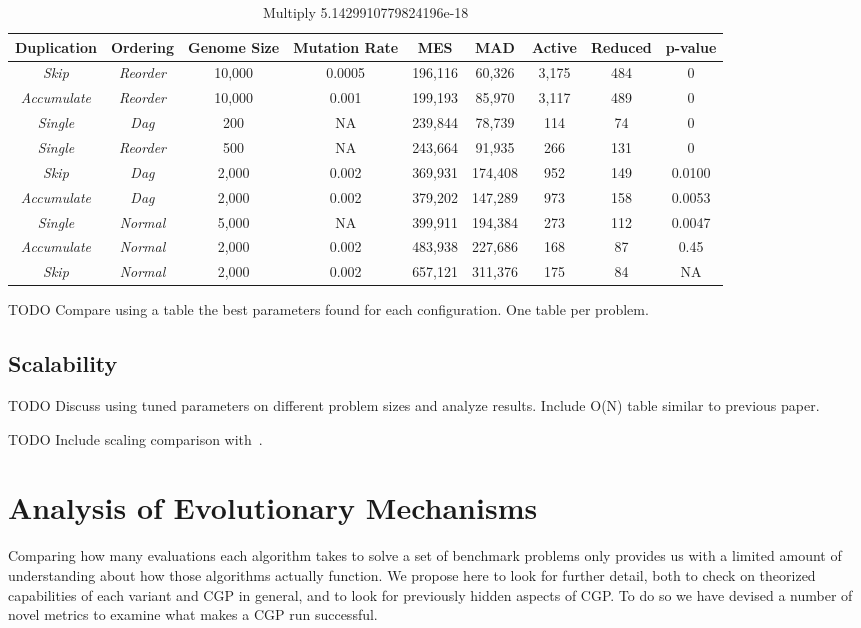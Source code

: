 \documentclass[journal]{IEEEtran}
\begin{document}
\begin{table*}
	\centering
	\begin{tabular}{|c|c|c|c|c|c|c|c|c|}
	  \hline
\textbf{Duplication} & \textbf{Ordering} & \textbf{Genome Size} & \textbf{Mutation Rate} & \textbf{MES} & \textbf{MAD} & \textbf{Active} & \textbf{Reduced} & \textbf{p-value} \\ \hline
\emph{Skip} & \emph{Reorder}      & 10,000 & 0.0005  & 196,116  & 60,326  & 3,175 & 484 & 0  \\ \hline
\emph{Accumulate} & \emph{Reorder}& 10,000 & 0.001 & 199,193 & 85,970 & 3,117 & 489 & 0  \\ \hline
\emph{Single} & \emph{Dag} & 200  & NA & 239,844 & 78,739 & 114 & 74 & 0 \\ \hline
\emph{Single} & \emph{Reorder}    & 500   & NA & 243,664 & 91,935 & 266 & 131 & 0 \\ \hline
\emph{Skip} & \emph{Dag}          & 2,000 & 0.002 & 369,931 & 174,408 & 952 & 149 & 0.0100 \\ \hline
\emph{Accumulate} & \emph{Dag}    & 2,000 & 0.002  & 379,202 & 147,289 & 973 & 158 & 0.0053  \\ \hline
\emph{Single} & \emph{Normal}     & 5,000  & NA & 399,911 & 194,384 & 273 & 112 & 0.0047 \\ \hline
\emph{Accumulate} & \emph{Normal} & 2,000 & 0.002 & 483,938 & 227,686 & 168 & 87 & 0.45 \\ \hline
\rowcolor{Gray}
\emph{Skip} & \emph{Normal} & 2,000 & 0.002 & 657,121 & 311,376 & 175 & 84 & NA \\ \hline

	\end{tabular}
	\caption{Multiply 5.1429910779824196e-18}
	\label{tab:Multiply}
\end{table*}


TODO Compare using a table the best parameters found for each configuration.
One table per problem.


\subsection{Scalability}
TODO Discuss using tuned parameters on different problem sizes and analyze
results.  Include O(N) table similar to previous paper.

TODO Include scaling comparison with~\cite{walker:2008:cgpmodules}.

\section{Analysis of Evolutionary Mechanisms}
\label{sec:analysis}
Comparing how many evaluations each algorithm takes to solve a set of benchmark
problems only provides us with a limited amount of understanding about how
those algorithms actually function.  We propose here to look for further detail,
both to check on theorized capabilities of each variant and CGP in general, and
to look for previously hidden aspects of CGP.
To do so we have devised a number of novel metrics to examine what makes a
CGP run successful.
\end{document}
